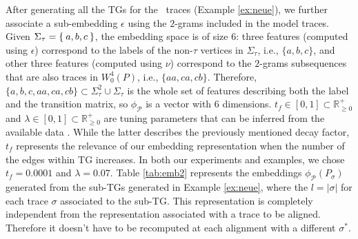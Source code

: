\begin{example}\label{ex:withpaths} After generating all the TGs for the \unravelled\ traces (Example \ref{ex:neue}), we further associate a sub-embedding $\epsilon$ using the $2$-grams included in the model traces.
Given $\Sigma_\tau=\Set{a,b,c}$, the embedding space is of size $6$: three features (computed using $\epsilon$) correspond to the labels of the non-$\tau$ vertices in $\Sigma_\tau$, i.e., $\{a,b,c\}$, and other three features (computed using $\nu$) correspond to the $2$-grams subsequences that are also traces in $W^4_0(P)$, i.e., $\{aa,ca,cb\}$. Therefore, $\{a,b,c,aa,ca,cb\}\subset \Sigma_\tau^2\cup\Sigma_\tau$ is the whole set of features describing both the label and the transition matrix, so $\phi_{\mathcal{P}}$ is a vector with 6 dimensions.
$t_f\in [0,1]\subset\mathbb{R}^+_{\geq 0}$ and $\lambda\in [0,1]\subset\mathbb{R}^+_{\geq 0}$ are tuning parameters that can be inferred from the available data \cite{DriessensRG06}. While the latter describes the previously mentioned decay factor, $t_f$ represents the relevance of our embedding representation when the number of the edges within TG increases. In both our experiments and examples, we chose $t_f=0.0001$ and $\lambda=0.07$.
Table \ref{tab:emb2} represents the embeddings $\phi_{\mathcal{P}}(P_\sigma)$ generated from the sub-TGs generated in Example \ref{ex:neue}, where the $l=|\sigma|$ for each trace $\sigma$ associated to the sub-TG. This representation is completely independent from the representation associated with a trace to be aligned. Therefore it doesn't have to be recomputed at each alignment with a different $\sigma^*$.

\end{example}
